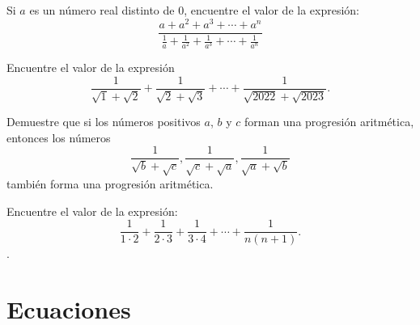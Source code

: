 \begin{problem}
Si $a$ es un número real distinto de $0$, encuentre el valor de la expresión:
\[\frac{a + a^2 + a^3 + \cdots + a^n}{\frac{1}{a} + \frac{1}{a^2} + \frac{1}{a^3} + \cdots + \frac{1}{a^n}}\]
\end{problem}

\begin{problem}
Encuentre el valor de la expresión
\[\frac1{\sqrt1 + \sqrt2} + \frac1{\sqrt2 + \sqrt3} + \cdots + \frac1{\sqrt{2022} + \sqrt{2023}}.\]
\end{problem}

\begin{problem}
Demuestre que si los números positivos $a$, $b$ y $c$
forman una progresión aritmética,
entonces los números
\[\frac1{\sqrt b + \sqrt c}, \frac1{\sqrt c + \sqrt a}, \frac1{\sqrt a + \sqrt b}\]
también forma una progresión aritmética.

\end{problem}

\begin{problem}
Encuentre el valor de la expresión:
\[\frac1{1\cdot2} + \frac1{2\cdot3} + \frac1{3\cdot4} + \cdots + \frac1{n(n + 1)}.\]
.
\end{problem}
\section{Ecuaciones}
